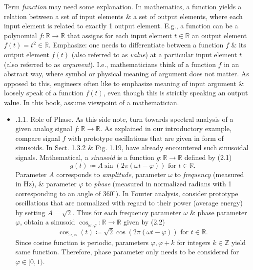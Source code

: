 \documentclass{article}
\begin{document}
\begin{itemize}
\begin{itemize}
\begin{itemize}
			Term {\it function} may need some explanation. In mathematics, a function yields a relation between a set of input elements \& a set of output elements, where each input element is related to exactly 1 output element. E.g., a function can be a polynomial $f:\mathbb{R}\to\mathbb{R}$ that assigns for each input element $t\in\mathbb{R}$ an output element $f(t) = t^2\in\mathbb{R}$. Emphasize: one needs to differentiate between a function $f$ \& its output element $f(t)$ (also referred to as {\it value}) at a particular input element $t$ (also referred to as {\it argument}). I.e., mathematicians think of a function $f$ in an abstract way, where symbol or physical meaning of argument does not matter. As opposed to this, engineers often like to emphasize meaning of input argument \& loosely speak of a function $f(t)$, even though this is strictly speaking an output value. In this book, assume viewpoint of a mathematician.
			\begin{itemize}
				\item {.1.1. Role of Phase.} As this side note, turn towards spectral analysis of a given analog signal $f:\mathbb{R}\to\mathbb{R}$. As explained in our introductory example, compare signal $f$ with prototype oscillations that are given in form of sinusoids. In Sect. 1.3.2 \& {\sf Fig. 1.19}, have already encountered such sinusoidal signals. Mathematical, a {\it sinusoid} is a function $g:\mathbb{R}\to\mathbb{R}$ defined by (2.1)
				\begin{equation*}
					g(t)\coloneqq A\sin(2\pi(\omega t - \varphi))\mbox{ for } t\in\mathbb{R}.
				\end{equation*}
				Parameter $A$ corresponds to {\it amplitude}, parameter $\omega$ to {\it frequency} (measured in Hz), \& parameter $\varphi$ to {\it phase} (measured in normalized radians with 1 corresponding to an angle of $360^\circ$). In Fourier analysis, consider prototype oscillations that are normalized with regard to their power (average energy) by setting $A = \sqrt{2}$. Thus for each frequency parameter $\omega$ \& phase parameter $\varphi$, obtain a sinusoid $\cos_{\omega,\varphi}:\mathbb{R}\to\mathbb{R}$ given by (2.2)
				\begin{equation*}
					\cos_{\omega,\varphi}(t)\coloneqq\sqrt{2}\cos(2\pi(\omega t - \varphi))\mbox{ for } t\in\mathbb{R}.
				\end{equation*}
				Since cosine function is periodic, parameters $\varphi,\varphi + k$ for integers $k\in\mathbb{Z}$ yield same function. Therefore, phase parameter only needs to be considered for $\varphi\in[0,1)$.
				

\end{itemize}
\end{itemize}
\end{itemize}
\end{itemize}
\end{document}
